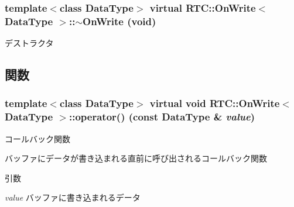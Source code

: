 \subsubsection[{$\sim$OnWrite}]{\setlength{\rightskip}{0pt plus 5cm}template$<$class DataType$>$ virtual {\bf RTC::OnWrite}$<$ DataType $>$::$\sim${\bf OnWrite} (void)\hspace{0.3cm}{\ttfamily  [inline, virtual]}}\label{classRTC_1_1OnWrite_a2d933024e730be0535ecf38efe40aede}
デストラクタ 

\subsection{関数}
\subsubsection[{operator()}]{\setlength{\rightskip}{0pt plus 5cm}template$<$class DataType$>$ virtual void {\bf RTC::OnWrite}$<$ DataType $>$::operator() (const DataType \& {\em value})\hspace{0.3cm}{\ttfamily  [pure virtual]}}\label{classRTC_1_1OnWrite_a21dbf5431532045a4c953d7c8ed09777}


コールバック関数 

バッファにデータが書き込まれる直前に呼び出されるコールバック関数


\begin{DoxyParams}{引数}
\item[{\em value}]バッファに書き込まれるデータ \end{DoxyParams}
